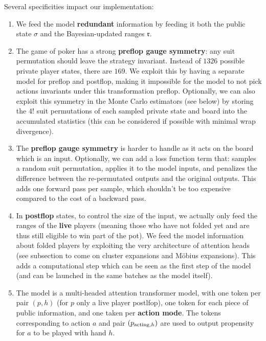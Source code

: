 \documentclass[12pt, a4paper]{article}
\begin{document}
Several specificities impact our implementation:
\begin{enumerate}
  \item We feed the model \textbf{redundant} information by feeding it both the public state $\sigma$ and the Bayesian-updated ranges $\mathfrak{r}$.
  
  \item The game of poker has a strong \textbf{preflop gauge symmetry}: any suit permutation should leave the strategy invariant.
  Instead of $1326$ possible private player states, there are $169$.
  We exploit this by having a separate model for preflop and postflop, making it impossible for the model to not pick actions invariants under this transformation preflop.
  Optionally, we can also exploit this symmetry in the Monte Carlo estimators (see below) by storing the $4!$ suit permutations of each sampled private state and board into the accumulated statistics (this can be considered if possible with minimal wrap divergence).
  
  \item The \textbf{\textbf{preflop gauge symmetry}} is harder to handle as it acts on the board which is an input.
  Optionally, we can add a loss function term that: samples a random suit permutation, applies it to the model inputs, and penalizes the difference between the re-permutated outputs and the original outputs.
  This adds one forward pass per sample, which shouldn't be too expensive compared to the cost of a backward pass. 
  
  \item In \textbf{postflop} states, to control the size of the input, we actually only feed the ranges of the \textbf{live} players (meaning those who have not folded yet and are thus still eligible to win part of the pot).
  We feed the model information about folded players by exploiting the very architecture of attention heads (see subsection to come on cluster expansions and Möbius expansions).
  This adds a computational step which can be seen as the first step of the model (and can be launched in the same batches as the model itself).

  \item The model is a multi-headed attention transformer model, with one token per pair $(p,h)$ (for $p$ only a live player postlfop), one token for each piece of public information, and one taken per \textbf{action mode}.
  The tokens corresponding to action $a$ and pair $(p_{\textnormal{acting}, h})$ are used to output propensity for $a$ to be played with hand $h$.


\end{enumerate}
\end{document}

